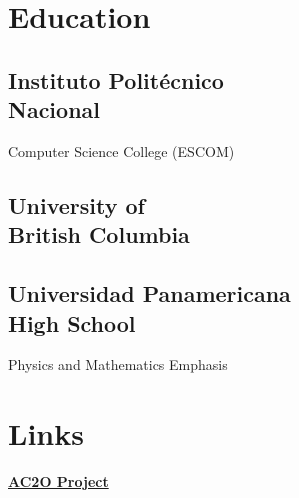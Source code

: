\documentclass[]{resume-openfont}
\begin{document}
%
%

%
%


%
%

\begin{minipage}[t]{0.33\textwidth}


\section{Education}

\subsection{Instituto Politécnico\\ Nacional}
Computer Science College (ESCOM) \\
\sectionsep

\subsection{University of \\ British Columbia}
\sectionsep

\subsection{Universidad Panamericana \\ High School}
Physics and Mathematics Emphasis



\section{Links}
\href{https://www.linkedin.com/in/hecarrilloe/}{\bf \faLinkedinSquare} \quad \href{https://github.com/hecarrillo}{\bf \faGithubAlt} \quad \href{https://ac2oubco.wixsite.com/ac2o/people}{\bf AC2O Project}


\end{minipage}
\end{document}

